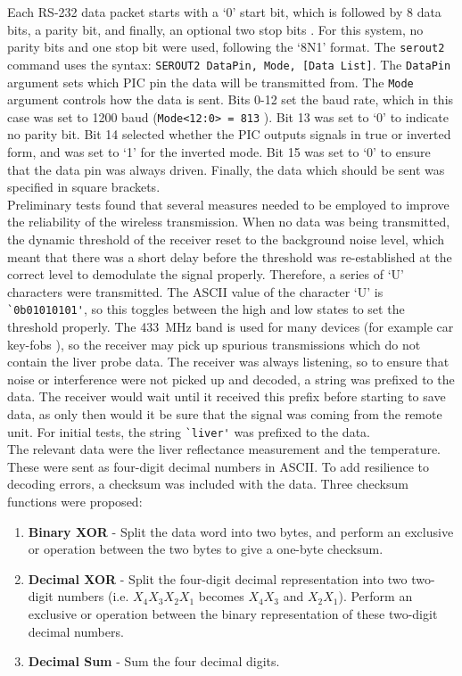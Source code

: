 Each RS-232 data packet starts with a `0' start bit, which is followed by 8 data bits, a parity bit, and finally, an optional two stop bits \cite{rs232}. For this system, no parity bits and one stop bit were used, following the `8N1' format. The \verb|serout2| command uses the syntax: \verb|SEROUT2 DataPin, Mode, [Data List]|. The \verb|DataPin| argument sets which PIC pin the data will be transmitted from. The \verb|Mode| argument controls how the data is sent. Bits 0-12 set the baud rate, which in this case was set to 1200 baud (\verb|Mode<12:0> = 813| \cite{picbasic_pro}). Bit 13 was set to `0' to indicate no parity bit. Bit 14 selected whether the PIC outputs signals in true or inverted form, and was set to `1' for the inverted mode. Bit 15 was set to `0' to ensure that the data pin was always driven. Finally, the data which should be sent was specified in square brackets.\\

Preliminary tests found that several measures needed to be employed to improve the reliability of the wireless transmission. When no data was being transmitted, the dynamic threshold of the receiver reset to the background noise level, which meant that there was a short delay before the threshold was re-established at the correct level to demodulate the signal properly. Therefore, a series of `U' characters were transmitted. The ASCII value of the character `U' is \verb|`0b01010101'|, so this toggles between the high and low states to set the threshold properly. The \SI{433}{\mega\hertz} band is used for many devices (for example car key-fobs \cite{qam-rx}), so the receiver may pick up spurious transmissions which do not contain the liver probe data. The receiver was always listening, so to ensure that noise or interference were not picked up and decoded, a string was prefixed to the data. The receiver would wait until it received this prefix before starting to save data, as only then would it be sure that the signal was coming from the remote unit. For initial tests, the string \verb|`liver'| was prefixed to the data. \\

The relevant data were the liver reflectance measurement and the temperature. These were sent as four-digit decimal numbers in ASCII. To add resilience to decoding errors, a checksum was included with the data. Three checksum functions were proposed:
\begin{enumerate}
\item \label{check: binary xor} \textbf{Binary XOR} - Split the data word into two bytes, and perform an exclusive or operation between the two bytes to give a one-byte checksum.
\item \label{check: decimal xor} \textbf{Decimal XOR} - Split the four-digit decimal representation into two two-digit numbers (i.e. $X_4X_3X_2X_1$ becomes $X_4X_3$ and $X_2X_1$). Perform an exclusive or operation between the binary representation of these two-digit decimal numbers.
\item \label{check: decimal sum} \textbf{Decimal Sum} - Sum the four decimal digits.
\end{enumerate}

